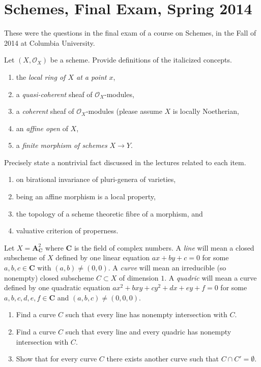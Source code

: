 \section{Schemes, Final Exam, Spring 2014}
\label{section-final-exam-spring-2014}

\noindent
These were the questions in the final exam of a course on
Schemes, in the Fall of 2014 at Columbia University.

\begin{exercise}[Definitions]
\label{exercise-definitions-spring-2014}
Let $(X, \mathcal{O}_X)$ be a scheme. Provide definitions of the
italicized concepts.
\begin{enumerate}
\item the {\it local ring of $X$ at a point $x$},
\item a {\it quasi-coherent} sheaf of $\mathcal{O}_X$-modules,
\item a {\it coherent} sheaf of $\mathcal{O}_X$-modules (please
assume $X$ is locally Noetherian,
\item an {\it affine open} of $X$,
\item a {\it finite morphism of schemes} $X \to Y$.
\end{enumerate}
\end{exercise}

\begin{exercise}[Theorems]
\label{exercise-results-spring-2014}
Precisely state a nontrivial fact discussed in the lectures related
to each item.
\begin{enumerate}
\item on birational invariance of pluri-genera of varieties,
\item being an affine morphism is a local property,
\item the topology of a scheme theoretic fibre of a morphism, and
\item valuative criterion of properness.
\end{enumerate}
\end{exercise}

\begin{exercise}
\label{exercise-miss-curve}
Let $X = \mathbf{A}^2_\mathbf{C}$ where $\mathbf{C}$ is the field
of complex numbers. A {\it line} will mean a closed
subscheme of $X$ defined by one linear equation $ax + by + c = 0$ for
some $a, b, c \in \mathbf{C}$ with $(a, b) \not = (0, 0)$.
A {\it curve} will mean an irreducible (so nonempty) closed subscheme
$C \subset X$ of dimension $1$.
A {\it quadric} will mean a curve defined by one
quadratic equation $ax^2 + bxy + cy^2 + dx + ey + f = 0$
for some $a, b, c, d, e, f \in \mathbf{C}$ and
$(a, b, c) \not = (0, 0, 0)$.
\begin{enumerate}
\item Find a curve $C$ such that every line has nonempty intersection with $C$.
\item Find a curve $C$ such that every line and every quadric has nonempty
intersection with $C$.
\item Show that for every curve $C$ there exists another curve
such that $C \cap C' = \emptyset$.
\end{enumerate}
\end{exercise}

